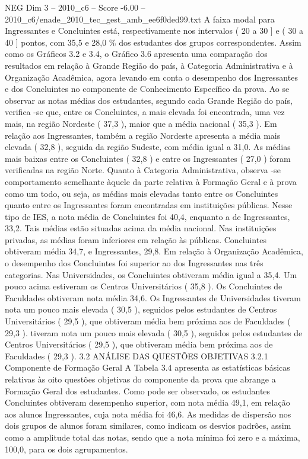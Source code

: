 \begin{textsample}{NEG Dim 3 – 2010\_c6 – Score -6.00 – 2010\_c6/enade\_2010\_tec\_gest\_amb\_ee6f0ded99.txt}
A faixa modal para Ingressantes e Concluintes está, respectivamente nos intervalos ( 20 a 30 ] e ( 30 a 40 ] pontos, com 35,5 e 28,0 \% dos estudantes dos grupos correspondentes.
Assim como os Gráficos 3.2 e 3.4, o Gráfico 3.6 apresenta uma comparação dos resultados em relação à Grande Região do país, à Categoria Administrativa e à Organização Acadêmica, agora levando em conta o desempenho dos Ingressantes e dos Concluintes no componente de Conhecimento Específico da prova.
Ao se observar as notas médias dos estudantes, segundo cada Grande Região do país, verifica -se que, entre os Concluintes, a mais elevada foi encontrada, uma vez mais, na região Nordeste ( 37,3 ), maior que a média nacional ( 35,3 ).
Em relação aos Ingressantes, também a região Nordeste apresenta a média mais elevada ( 32,8 ), seguida da região Sudeste, com média igual a 31,0.
As médias mais baixas entre os Concluintes ( 32,8 ) e entre os Ingressantes ( 27,0 ) foram verificadas na região Norte.
Quanto à Categoria Administrativa, observa -se comportamento semelhante àquele da parte relativa à Formação Geral e à prova como um todo, ou seja, as médias mais elevadas tanto entre os Concluintes quanto entre os Ingressantes foram encontradas em instituições públicas.
Nesse tipo de IES, a nota média de Concluintes foi 40,4, enquanto a de Ingressantes, 33,2.
Tais médias estão situadas acima da média nacional.
Nas instituições privadas, as médias foram inferiores em relação às públicas.
Concluintes obtiveram média 34,7, e Ingressantes, 29,8.
Em relação à Organização Acadêmica, o desempenho dos Concluintes foi superior ao dos Ingressantes nas três categorias.
Nas Universidades, os Concluintes obtiveram média igual a 35,4.
Um pouco acima estiveram os Centros Universitários ( 35,8 ).
Os Concluintes de Faculdades obtiveram nota média 34,6.
Os Ingressantes de Universidades tiveram nota um pouco mais elevada ( 30,5 ), seguidos pelos estudantes de Centros Universitários ( 29,5 ), que obtiveram média bem próxima aos de Faculdades ( 29,3 ). tiveram nota um pouco mais elevada ( 30,5 ), seguidos pelos estudantes de Centros Universitários ( 29,5 ), que obtiveram média bem próxima aos de Faculdades ( 29,3 ). 3.2 ANÁLISE DAS QUESTÕES OBJETIVAS 3.2.1 Componente de Formação Geral A Tabela 3.4 apresenta as estatísticas básicas relativas às oito questões objetivas do componente da prova que abrange a Formação Geral dos estudantes.
Como pode ser observado, os estudantes Concluintes obtiveram desempenho superior, com nota média 49,1, em relação aos alunos Ingressantes, cuja nota média foi 46,6.
As medidas de dispersão nos dois grupos de alunos foram similares, como indicam os desvios padrões, assim como a amplitude total das notas, sendo que a nota mínima foi zero e a máxima, 100,0, para os dois agrupamentos.

\end{textsample}
